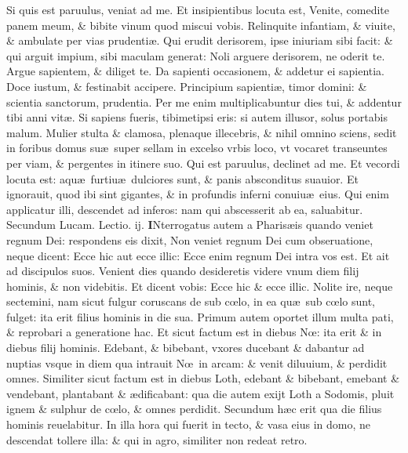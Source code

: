 \documentclass[a5paper,10pt]{book}
\def\leftmarginnote{%
	\lrmarginnote{\hskip -\marginparsep \hskip -6.5em}}
\def\ae{æ}
\def\oe{œ}
\begin{document}
\begin{multicols*}{2}
Si quis est paruulus, veniat ad me. Et insipientibus locuta est, Venite, comedite panem meum, \& bibite vinum quod miscui vobis.
Relinquite infantiam, \& viuite, \& ambulate per vias prudenti\ae . Qui erudit derisorem, ipse iniuriam sibi facit: \& qui arguit impium, sibi maculam generat: Noli arguere derisorem, ne oderit te. Argue sapientem, \& diliget te.
Da sapienti occasionem, \& addetur ei sapientia. Doce iustum, \& festinabit accipere. Principium sapienti\ae , timor domini: \& scientia sanctorum, prudentia.
Per me enim multiplicabuntur dies tui, \& addentur tibi anni vit\ae . Si sapiens fueris, tibimetipsi eris: si autem illusor, solus portabis malum.
Mulier stulta \& clamosa, plenaque illecebris, \& nihil omnino sciens, sedit in foribus domus su\ae \ super sellam in excelso vrbis loco, vt vocaret transeuntes per viam, \& pergentes in itinere suo.
Qui est paruulus, declinet ad me. Et vecordi locuta est: aqu\ae \ furtiu\ae \ dulciores sunt, \& panis absconditus suauior.
Et ignorauit, quod ibi sint gigantes, \& in profundis inferni conuiu\ae \ eius.
Qui enim applicatur illi, descendet ad inferos: nam qui abscesserit ab ea, saluabitur.%
\newline \color{red} Secundum Lucam. \hfill Lectio. ij. \color{black}
\vspace{-.25em}
\lettrine[lines=2]{\bfseries \color{red} I}{}Nterrogatus\leftmarginnote{\begin{flushright}c. 17.\end{flushright}} autem a Pharis\ae is quando veniet regnum Dei: respondens eis dixit, Non veniet regnum Dei cum obseruatione, neque dicent: Ecce hic aut ecce illic: Ecce enim regnum Dei intra vos est.
Et ait ad discipulos suos. Venient dies quando desideretis videre vnum diem filij hominis, \& non videbitis. Et dicent vobis: Ecce hic \& ecce illic.
Nolite ire, neque sectemini, nam sicut fulgur coruscans de sub c\oe lo, in ea qu\ae \ sub c\oe lo sunt, fulget: ita erit filius hominis in die sua.
Primum autem oportet illum multa pati, \& reprobari a generatione hac.
Et sicut factum est in diebus N\oe : ita erit \& in diebus filij hominis. Edebant,
\& bibebant, vxores ducebant \& dabantur ad nuptias vsque in diem qua intrauit N\oe \ in arcam: \& venit diluuium, \& perdidit omnes.
Similiter sicut factum est in diebus Loth, edebant \& bibebant, emebant \& vendebant, plantabant \& \ae dificabant: qua die autem exijt Loth a Sodomis, pluit ignem \& sulphur de c\oe lo, \& omnes perdidit.
Secundum h\ae c erit qua die filius hominis reuelabitur.
In illa hora qui fuerit in tecto, \& vasa eius in domo, ne descendat tollere illa: \& qui in agro, similiter non redeat retro.

\end{multicols*}
\end{document}
